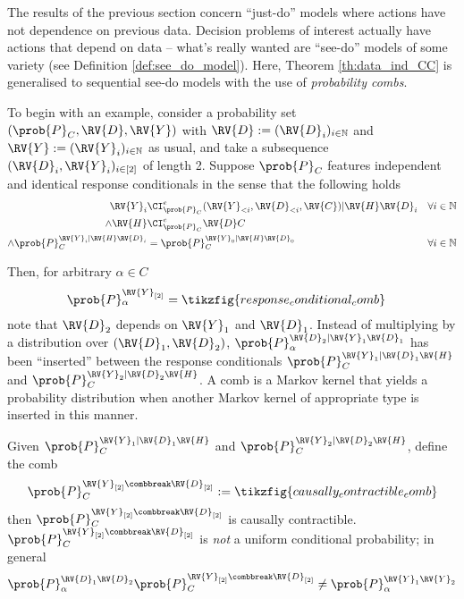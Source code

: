 The results of the previous section concern ``just-do'' models where actions have not dependence on previous data. Decision problems of interest actually have actions that depend on data -- what's really wanted are ``see-do'' models of some variety (see Definition \ref{def:see_do_model}). Here, Theorem \ref{th:data_ind_CC} is generalised to sequential see-do models with the use of \emph{probability combs}.

To begin with an example, consider a probability set $(\prob{P}_C,\RV{D},\RV{Y})$ with $\RV{D}:=(\RV{D}_i)_{i\in\mathbb{N}}$ and $\RV{Y}:=(\RV{Y}_i)_{i\in\mathbb{N}}$ as usual, and take a subsequence $(\RV{D}_i,\RV{Y}_i)_{i\in [2]}$ of length 2. Suppose $\prob{P}_C$ features independent and identical response conditionals in the sense that the following holds
\begin{align}
    \RV{Y}_i&\CI^e_{\prob{P}_C} (\RV{Y}_{<i},\RV{D}_{<i},\RV{C})|\RV{H}\RV{D}_i&\forall i\in \mathbb{N}\\
    \land \RV{H} &\CI^e_{\prob{P}_C} \RV{D} C\\
    \land \prob{P}_C^{\RV{Y}_i|\RV{H}\RV{D}_i} &= \prob{P}_C^{\RV{Y}_0|\RV{H}\RV{D}_0} & \forall i\in \mathbb{N}
\end{align}

Then, for arbitrary $\alpha\in C$
\begin{align}
    \prob{P}_\alpha^{\RV{Y}_{[2]}} &= \tikzfig{response_conditional_comb}
\end{align}
note that $\RV{D}_2$ depends on $\RV{Y}_1$ and $\RV{D}_1$. Instead of multiplying by a distribution over $(\RV{D}_1,\RV{D}_2)$, $\prob{P}_\alpha^{\RV{D}_2|\RV{Y}_1\RV{D}_1}$ has been ``inserted'' between the response conditionals $\prob{P}_C^{\RV{Y}_1|\RV{D}_1\RV{H}}$ and $\prob{P}_C^{\RV{Y}_2|\RV{D}_2\RV{H}}$. A comb is a Markov kernel that yields a probability distribution when another Markov kernel of appropriate type is inserted in this manner.

Given $\prob{P}_C^{\RV{Y}_1|\RV{D}_1\RV{H}}$ and $\prob{P}_C^{\RV{Y}_2|\RV{D}_2\RV{H}}$, define the comb
\begin{align}
    \prob{P}_C^{\RV{Y}_{[2]}\combbreak \RV{D}_{[2]}} := \tikzfig{causally_contractible_comb}
\end{align}
then $\prob{P}_C^{\RV{Y}_{[2]}\combbreak \RV{D}_{[2]}}$ is causally contractible. $\prob{P}_C^{\RV{Y}_{[2]}\combbreak \RV{D}_{[2]}}$ is \emph{not} a uniform conditional probability; in general 
\begin{align}
    \prob{P}_\alpha^{\RV{D}_1\RV{D}_2} \prob{P}_C^{\RV{Y}_{[2]}\combbreak \RV{D}_{[2]}}\neq \prob{P}_\alpha^{\RV{Y}_1\RV{Y}_2}
\end{align}



